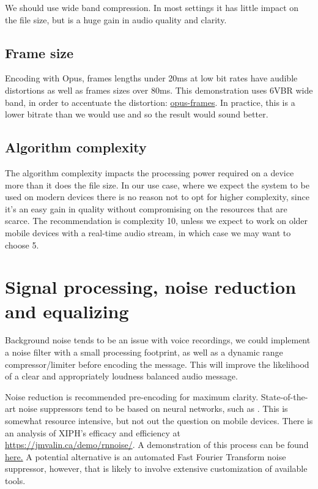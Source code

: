 \documentclass{article}
\begin{document}
We should use wide band compression. In most settings it has little impact on the file size, but is a huge gain in audio quality and clarity.

\subsection{Frame size}


Encoding with Opus, frames lengths under 20ms at low bit rates have audible distortions as well as frames sizes over 80ms. This demonstration uses 6VBR wide band, in order to accentuate the distortion: \href{https://brettpreston.github.io/audio/KnPAudio/opusframes.flac}{opus-frames}. In practice, this is a lower bitrate than we would use and so the result would sound better.

\subsection{Algorithm complexity}

The algorithm complexity impacts the processing power required on a device more than it does the file size. In our use case, where we expect the system to be used on modern devices there is no reason not to opt for higher complexity, since it's an easy gain in quality without compromising on the resources that are scarce. The recommendation is complexity 10, unless we expect to work on older mobile devices with a real-time audio stream, in which case we may want to choose 5.


\section{Signal processing, noise reduction and equalizing}

Background noise tends to be an issue with voice recordings, we could implement a noise filter with a small processing footprint, as well as a dynamic range compressor/limiter before encoding the message. This will improve the likelihood of a clear and appropriately loudness balanced audio message.

Noise reduction is recommended pre-encoding for maximum clarity. State-of-the-art noise suppressors tend to be based on neural networks, such as \cite{xiph} \cite{werman}. This is somewhat resource intensive, but not out the question on mobile devices. There is an analysis of XIPH's efficacy and efficiency at \href{https://jmvalin.ca/demo/rnnoise/}{https://jmvalin.ca/demo/rnnoise/}. A demonstration of this process can be found \href{https://brettpreston.github.io/audio/KnPAudio/rnnoise-opus-codec2.flac}{here.}
A potential alternative is an automated Fast Fourier Transform noise suppressor, however, that is likely to involve extensive customization of available tools.
\end{document}
